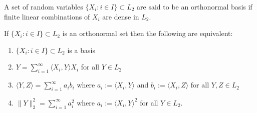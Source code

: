 \begin{definition}
A set of random variables $\{ X_i:i\in I\}\subset L_2$ are said to be an orthonormal basis if finite linear combinations of $X_i$ are dense in $L_2$.
\end{definition}



\begin{theorem}
If $\{ X_i:i\in I\}\subset L_2$ is an orthonormal set then the following are equivalent:
\begin{enumerate}
\item $\{ X_i:i\in I\}\subset L_2$ is a basis
\item $Y = \sum_{i=1}^\infty \langle X_i, Y\rangle X_i$ for all $Y\in L_2$
\item $\langle Y, Z\rangle = \sum_{i=1}^\infty a_ib_i $ where $a_i := \langle X_i, Y\rangle$ and $b_i := \langle X_i, Z\rangle$ for all $Y, Z\in L_2$
\item $\|Y\|_2^2 = \sum_{i=1}^\infty a_i^2$ where $a_i:=\langle X_i, Y\rangle^2 $ for all $Y\in L_2$.
\end{enumerate}
\end{theorem}
